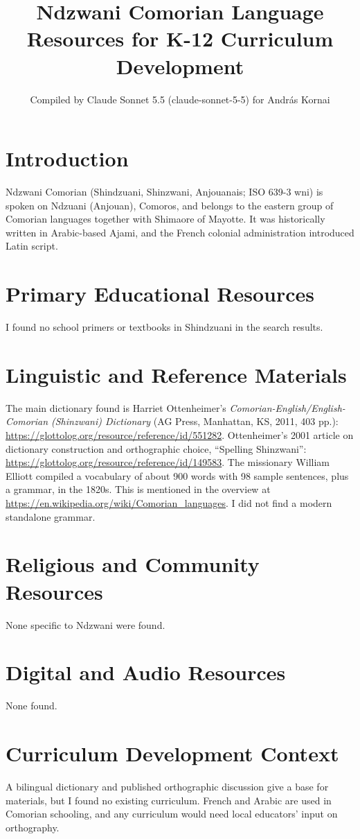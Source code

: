 \documentclass[12pt]{article}
\title{Ndzwani Comorian Language Resources for K-12 Curriculum Development}
\author{Compiled by Claude Sonnet 5.5 (claude-sonnet-5-5) for Andr\'as Kornai}
\date{}
\begin{document}
\maketitle

\section{Introduction}
Ndzwani Comorian (Shindzuani, Shinzwani, Anjouanais; ISO 639-3 wni) is spoken on Ndzuani (Anjouan), Comoros, and belongs to the eastern group of Comorian languages together with Shimaore of Mayotte. It was historically written in Arabic-based Ajami, and the French colonial administration introduced Latin script.

\section{Primary Educational Resources}
I found no school primers or textbooks in Shindzuani in the search results.

\section{Linguistic and Reference Materials}
The main dictionary found is Harriet Ottenheimer's \emph{Comorian-English/English-Comorian (Shinzwani) Dictionary} (AG Press, Manhattan, KS, 2011, 403 pp.): \url{https://glottolog.org/resource/reference/id/551282}. Ottenheimer's 2001 article on dictionary construction and orthographic choice, ``Spelling Shinzwani'': \url{https://glottolog.org/resource/reference/id/149583}. The missionary William Elliott compiled a vocabulary of about 900 words with 98 sample sentences, plus a grammar, in the 1820s. This is mentioned in the overview at \url{https://en.wikipedia.org/wiki/Comorian_languages}. I did not find a modern standalone grammar.

\section{Religious and Community Resources}
None specific to Ndzwani were found.

\section{Digital and Audio Resources}
None found.

\section{Curriculum Development Context}
A bilingual dictionary and published orthographic discussion give a base for materials, but I found no existing curriculum. French and Arabic are used in Comorian schooling, and any curriculum would need local educators' input on orthography.
\end{document}
